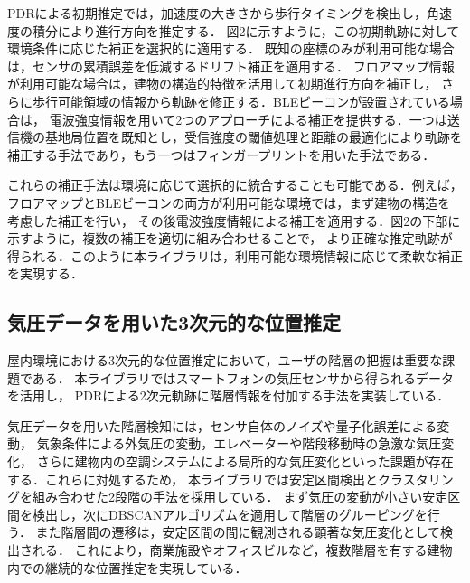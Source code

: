 \documentclass[a4paper, 10pt, twocolumn]{jarticle}
\begin{document}
PDRによる初期推定では，加速度の大きさから歩行タイミングを検出し，角速度の積分により進行方向を推定する．
図2に示すように，この初期軌跡に対して環境条件に応じた補正を選択的に適用する．
既知の座標のみが利用可能な場合は，センサの累積誤差を低減するドリフト補正を適用する．
フロアマップ情報が利用可能な場合は，建物の構造的特徴を活用して初期進行方向を補正し，
さらに歩行可能領域の情報から軌跡を修正する．BLEビーコンが設置されている場合は，
電波強度情報を用いて2つのアプローチによる補正を提供する．一つは送信機の基地局位置を既知とし，受信強度の閾値処理と距離の最適化により軌跡を補正する手法であり，もう一つはフィンガープリントを用いた手法である．

これらの補正手法は環境に応じて選択的に統合することも可能である．例えば，
フロアマップとBLEビーコンの両方が利用可能な環境では，まず建物の構造を考慮した補正を行い，
その後電波強度情報による補正を適用する．図2の下部に示すように，複数の補正を適切に組み合わせることで，
より正確な推定軌跡が得られる．このように本ライブラリは，利用可能な環境情報に応じて柔軟な補正を実現する．



\subsection{気圧データを用いた3次元的な位置推定}
屋内環境における3次元的な位置推定において，ユーザの階層の把握は重要な課題である．
本ライブラリではスマートフォンの気圧センサから得られるデータを活用し，
PDRによる2次元軌跡に階層情報を付加する手法を実装している．

気圧データを用いた階層検知には，センサ自体のノイズや量子化誤差による変動，
気象条件による外気圧の変動，エレベーターや階段移動時の急激な気圧変化，
さらに建物内の空調システムによる局所的な気圧変化といった課題が存在する．これらに対処するため，
本ライブラリでは安定区間検出とクラスタリングを組み合わせた2段階の手法を採用している．
まず気圧の変動が小さい安定区間を検出し，次にDBSCANアルゴリズムを適用して階層のグルーピングを行う．
また階層間の遷移は，安定区間の間に観測される顕著な気圧変化として検出される．
これにより，商業施設やオフィスビルなど，複数階層を有する建物内での継続的な位置推定を実現している．
\end{document}
